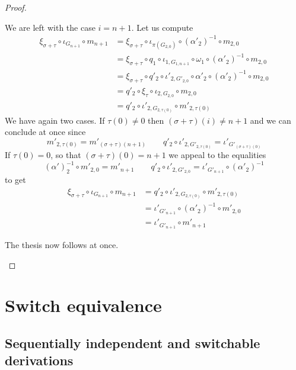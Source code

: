 \documentclass[a4paper,UKenglish,cleveref,pdftex, thm-restate,numberwithinsect]{lipics}
\begin{document}
\begin{proof}
\begin{itemize}
\begin{itemize}
	We are left with the case $i=n+1$. Let us compute
	\begin{align*}
		\xi_{\sigma+\tau}\circ \iota_{G_{n+1}} \circ m_{n+1} &= \xi_{\sigma+\tau} \circ \iota_{\pi(G_{2,0})} \circ (\alpha'_2)^{-1}\circ m_{2,0}\\&=\xi_{\sigma+\tau} \circ q_1\circ \iota_{1, G_{1,n+1}} \circ \omega_1 \circ (\alpha'_2)^{-1}\circ m_{2,0}\\&=\xi_{\sigma+\tau} \circ q'_2 \circ \iota'_{2,G'_{2,0}} \circ \alpha'_2 \circ (\alpha'_2)^{-1}\circ m_{2,0} \\&=q'_2 \circ \xi_\tau \circ \iota_{2, G_{2,0}} \circ m_{2,0}\\&=q'_2\circ \iota'_{2, G_{2,\tau(0)}} \circ m'_{2,\tau(0)}
	\end{align*}
	We have again two cases. If $\tau(0)\neq 0$ then $(\sigma+\tau)(i)\neq n+1$ and we can conclude at once since 
	\[m'_{2, \tau(0)}=m'_{(\sigma+\tau)(n+1)} \qquad q'_2\circ \iota'_{2, G'_{2,\tau(0)}}=
	\iota'_{G'_{(\sigma+\tau)(0)}}\] 
	If $\tau(0)=0$, so that  $(\sigma+\tau)(0)= n+1$ we appeal to the equalities
	\[(\alpha')^{-1}_2\circ m'_{2, 0}=m'_{n+1} \qquad q'_2\circ \iota'_{2, G'_{2, 0}}=
	\iota'_{G'_{n+1}}\circ (\alpha'_2)^{-1}\] 
	to get
	\begin{align*}
		\xi_{\sigma+\tau}\circ \iota_{G_{n+1}} \circ m_{n+1} &= q'_2\circ \iota'_{2, G_{2,\tau(0)}} \circ m'_{2,\tau(0)}\\&=	\iota'_{G'_{n+1}}\circ (\alpha'_2)^{-1}\circ m'_{2,0}\\&=\iota'_{G'_{n+1}}\circ  m'_{n+1}
	\end{align*}
\end{itemize}
The thesis now follows at once.	 \qedhere 
\end{itemize} \end{proof}
\fi 







\section{Switch equivalence }\label{sec:equi}



\subsection{Sequentially independent and switchable derivations }
\end{document}
